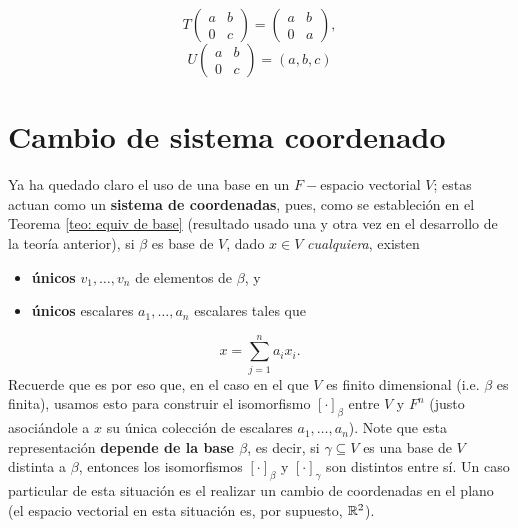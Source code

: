\[
T \begin{pmatrix}
a & b \\
0 & c
\end{pmatrix} = 
\begin{pmatrix}
a & b \\
0 & a
\end{pmatrix} ,
\]
\[
U
\begin{pmatrix}
a & b \\
0 & c
\end{pmatrix} = 
(a, b, c)
\]
\section{Cambio de sistema coordenado}


Ya ha quedado claro el uso de una base en un $F-$espacio 
vectorial $V$; estas actuan como un
\textbf{sistema de coordenadas}, pues, como se estableción
en el Teorema \ref{teo: equiv de base}
(resultado usado una y otra vez en el desarrollo
de la teoría anterior), si $\beta$ es base de $V$,
dado $x \in V$ \textit{cualquiera}, existen
\begin{itemize}
	\item \textbf{únicos} $v_{1}, \ldots, v_{n}$ de elementos 
	de $\beta$, y
	\item \textbf{únicos} escalares $a_{1}, \ldots, a_{n}$ escalares
	tales que
\end{itemize}
\[
x = \sum_{j = 1}^{n} a_{i} x_{i}.
\]
Recuerde que es por eso que, en el caso en el que $V$ es finito dimensional
(i.e. $\beta$ es finita), usamos esto para construir el isomorfismo
$[\cdot]_{\beta}$ entre $V$ y $F^{n}$ (justo asociándole a $x$ su única
colección de escalares $a_{1}, \ldots, a_{n}$). Note que esta representación
\textbf{depende de la base $\beta$}, es decir, si $\gamma \subseteq V$
es una base de $V$ distinta a $\beta$, entonces los isomorfismos
$[\cdot]_{\beta}$
y $[\cdot]_{\gamma}$ son distintos entre sí. Un caso particular de esta
situación es el realizar un cambio de coordenadas en el plano
(el espacio vectorial en esta situación es, por supuesto, $\mathbb{R}^{2}$).

